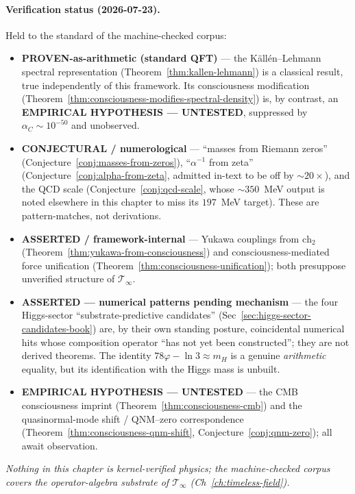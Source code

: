 \paragraph{Verification status (2026-07-23).}
Held to the standard of the machine-checked corpus:
\begin{itemize}
\item \textbf{PROVEN-as-arithmetic (standard QFT)} --- the K\"all\'en--Lehmann spectral representation (Theorem~\ref{thm:kallen-lehmann}) is a classical result, true independently of this framework. Its consciousness modification (Theorem~\ref{thm:consciousness-modifies-spectral-density}) is, by contrast, an \textbf{EMPIRICAL HYPOTHESIS --- UNTESTED}, suppressed by $\alpha_C\sim10^{-50}$ and unobserved.
\item \textbf{CONJECTURAL / numerological} --- ``masses from Riemann zeros'' (Conjecture~\ref{conj:masses-from-zeros}), ``$\alpha^{-1}$ from zeta'' (Conjecture~\ref{conj:alpha-from-zeta}, admitted in-text to be off by $\sim20\times$), and the QCD scale (Conjecture~\ref{conj:qcd-scale}, whose $\sim350$~MeV output is noted elsewhere in this chapter to miss its $197$~MeV target). These are pattern-matches, not derivations.
\item \textbf{ASSERTED / framework-internal} --- Yukawa couplings from $\text{ch}_2$ (Theorem~\ref{thm:yukawa-from-consciousness}) and consciousness-mediated force unification (Theorem~\ref{thm:consciousness-unification}); both presuppose unverified structure of $\mathcal{T}_\infty$.
\item \textbf{ASSERTED --- numerical patterns pending mechanism} --- the four Higgs-sector ``substrate-predictive candidates'' (Sec~\ref{sec:higgs-sector-candidates-book}) are, by their own standing posture, coincidental numerical hits whose composition operator ``has not yet been constructed''; they are not derived theorems. The identity $78\varphi-\ln3\approx m_H$ is a genuine \emph{arithmetic} equality, but its identification with the Higgs mass is unbuilt.
\item \textbf{EMPIRICAL HYPOTHESIS --- UNTESTED} --- the CMB consciousness imprint (Theorem~\ref{thm:consciousness-cmb}) and the quasinormal-mode shift / QNM--zero correspondence (Theorem~\ref{thm:consciousness-qnm-shift}, Conjecture~\ref{conj:qnm-zero}); all await observation.
\end{itemize}
\emph{Nothing in this chapter is kernel-verified physics; the machine-checked corpus covers the operator-algebra substrate of $\mathcal{T}_\infty$ (Ch~\ref{ch:timeless-field}).}

